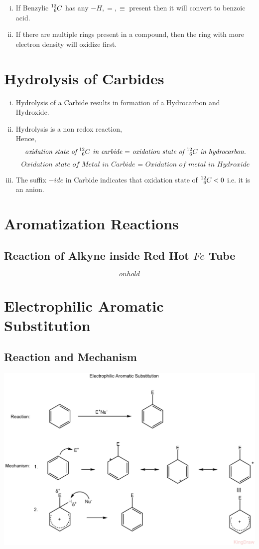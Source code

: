 \documentclass{article}
\begin{document}
\begin{enumerate}[i.]
    \item If Benzylic $\prescript{12}{6}{C}$ has any $-H, = , \equiv$ present then it will convert to benzoic acid.
    \item If there are multiple rings present in a compound, then the ring with more electron density will oxidize first.
\end{enumerate}
\section{Hydrolysis of Carbides}
\begin{enumerate}[i.]
    \item Hydrolysis of a Carbide results in formation of a Hydrocarbon and Hydroxide.
    \item Hydrolysis is a non redox reaction,\\
          Hence, $$\textit{oxidation state of $\prescript{12}{6}{C}$ in carbide $=$ oxidation state of $\prescript{12}{6}{C}$ in hydrocarbon.}$$
          $$\textit{Oxidation state of Metal in Carbide = Oxidation of metal in Hydroxide}$$
    \item The suffix $-ide$ in Carbide indicates that oxidation state of $\prescript{12}{6}{C} <0$ i.e. it is an anion.
\end{enumerate}
\section{Aromatization Reactions}
\subsection{Reaction of Alkyne inside Red Hot $Fe$ Tube}
$$on hold$$
\section{Electrophilic Aromatic Substitution}
\subsection{Reaction and Mechanism}
\includegraphics[scale=0.23]{EAS_1723190078116.PNG}
\end{document}
